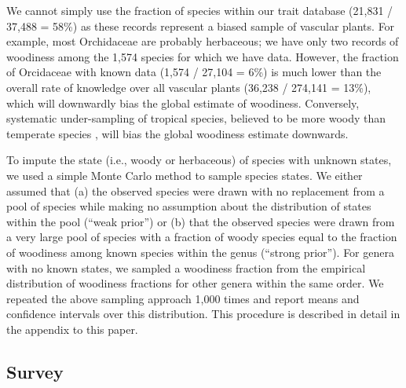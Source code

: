 \documentclass[12pt]{article}
\begin{document}
We cannot simply use the fraction of species within our trait database
(21,831 / 37,488 = 58\%) as these records represent a biased sample of
vascular plants.
For example, most Orchidaceae are probably herbaceous; we have only
two records of woodiness among the 1,574 species for which we have
data.
However, the fraction of Orcidaceae with known data (1,574 / 27,104 =
6\%)
is much lower than the overall rate of knowledge over all vascular
plants (36,238 / 274,141 = 13\%), which will downwardly bias the
global estimate of woodiness.
%
Conversely, systematic under-sampling of tropical species, believed to
be more woody than temperate species \citep{Molesheihgt}, will bias
the global woodiness estimate downwards.

To impute the state (i.e., woody or herbaceous) of species with
unknown states, we used a simple Monte Carlo method to sample species
states.  We either assumed that (a) the observed species were drawn
with no replacement from a pool of species while making no assumption
about the distribution of states within the pool (``weak prior'') or
(b) that the observed species were drawn from a very large pool of
species with a fraction of woody species equal to the fraction of
woodiness among known species within the genus (``strong prior'').
%
For genera with no known states, we sampled a woodiness fraction from
the empirical distribution of woodiness fractions for other genera
within the same order.
%
We repeated the above sampling approach 1,000 times and report means
and confidence intervals over this distribution.
%
This procedure is described in detail in the appendix to this paper.

\subsection{Survey}
\end{document}
